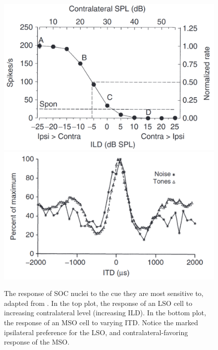 \documentclass[11pt,a4paper,twocolumn]{article}
\begin{document}
\begin{figure}
    \centering
    \includegraphics[width=0.7\linewidth]{Images/LSO-to-ILD.png}
    \includegraphics[width=0.7\linewidth]{Images/MSO-to-ITD.png}
    \caption{The response of SOC nuclei to the cue they are most sensitive to, adapted from \cite{yinNeuralMechanismsBinaural2019}. In the top plot, the response of an LSO cell to increasing contralateral level (increasing ILD). In the bottom plot, the response of an MSO cell to varying ITD. Notice the marked ipsilateral preference for the LSO, and contralateral-favoring response of the MSO.}
    \label{fig:lso-mso-expected}
\end{figure}
\end{document}
